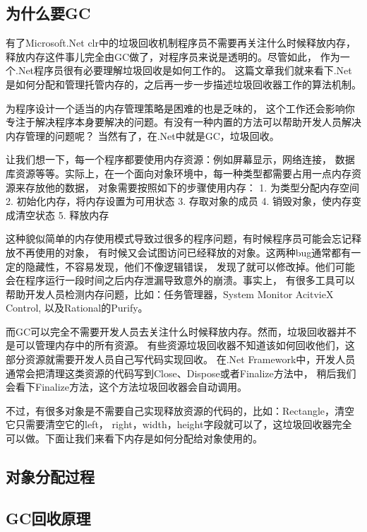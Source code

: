 \documentclass{book}
\begin{document}
\subsection{为什么要GC}

有了Microsoft.Net clr中的垃圾回收机制程序员不需要再关注什么时候释放内存，
释放内存这件事儿完全由GC做了，对程序员来说是透明的。尽管如此，
作为一个.Net程序员很有必要理解垃圾回收是如何工作的。
这篇文章我们就来看下.Net是如何分配和管理托管内存的，之后再一步一步描述垃圾回收器工作的算法机制。

为程序设计一个适当的内存管理策略是困难的也是乏味的，
这个工作还会影响你专注于解决程序本身要解决的问题。有没有一种内置的方法可以帮助开发人员解决内存管理的问题呢？
当然有了，在.Net中就是GC，垃圾回收。

让我们想一下，每一个程序都要使用内存资源：例如屏幕显示，网络连接，
数据库资源等等。实际上，在一个面向对象环境中，每一种类型都需要占用一点内存资源来存放他的数据，
对象需要按照如下的步骤使用内存：
1. 为类型分配内存空间
2. 初始化内存，将内存设置为可用状态
3. 存取对象的成员
4. 销毁对象，使内存变成清空状态
5. 释放内存

这种貌似简单的内存使用模式导致过很多的程序问题，有时候程序员可能会忘记释放不再使用的对象，
有时候又会试图访问已经释放的对象。这两种bug通常都有一定的隐藏性，不容易发现，他们不像逻辑错误，
发现了就可以修改掉。他们可能会在程序运行一段时间之后内存泄漏导致意外的崩溃。事实上，
有很多工具可以帮助开发人员检测内存问题，比如：任务管理器，System Monitor AcitvieX Control, 以及Rational的Purify。

而GC可以完全不需要开发人员去关注什么时候释放内存。然而，垃圾回收器并不是可以管理内存中的所有资源。
有些资源垃圾回收器不知道该如何回收他们，这部分资源就需要开发人员自己写代码实现回收。
在.Net Framework中，开发人员通常会把清理这类资源的代码写到Close、Dispose或者Finalize方法中，
稍后我们会看下Finalize方法，这个方法垃圾回收器会自动调用。

不过，有很多对象是不需要自己实现释放资源的代码的，比如：Rectangle，清空它只需要清空它的left，
right，width，height字段就可以了，这垃圾回收器完全可以做。下面让我们来看下内存是如何分配给对象使用的。

\subsection{对象分配过程}

\subsection{GC回收原理}
\end{document}
